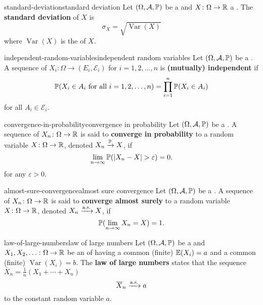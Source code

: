 \begin{topic}{standard-deviation}{standard deviation}
    Let $(\Omega, \mathcal{A}, \mathbb{P})$ be a  and $X \colon \Omega \to \mathbb{R}$ a . The \textbf{standard deviation} of $X$ is
    \[ \sigma_X = \sqrt{\operatorname{Var}(X)} \]
    where $\operatorname{Var}(X)$ is the  of $X$.
\end{topic}

\begin{topic}{independent-random-variables}{independent random variables}
    Let $(\Omega, \mathcal{A}, \mathbb{P})$ be a . A sequence of  $X_i \colon \Omega \to (E_i, \mathcal{E}_i)$ for $i = 1, 2, \ldots, n$ is \textbf{(mutually) independent} if
    \[ \mathbb{P}(X_i \in A_i \textup{ for all } i = 1, 2, \ldots, n) = \prod_{i = 1}^{n} \mathbb{P}(X_i \in A_i) \]
    for all $A_i \in \mathcal{E}_i$.
\end{topic}

\begin{topic}{convergence-in-probability}{convergence in probability}
    Let $(\Omega, \mathcal{A}, \mathbb{P})$ be a . A sequence of  $X_n \colon \Omega \to \mathbb{R}$ is said to \textbf{converge in probability} to a random variable $X \colon \Omega \to \mathbb{R}$, denoted $X_n \xrightarrow{\mathbb{P}} X$, if
    \[ \lim_{n \to \infty} \mathbb{P}(|X_n - X| > \varepsilon) = 0 . \]
    for any $\varepsilon > 0$.
\end{topic}

\begin{topic}{almost-sure-convergence}{almost sure convergence}
    Let $(\Omega, \mathcal{A}, \mathbb{P})$ be a . A sequence of  $X_n \colon \Omega \to \mathbb{R}$ is said to \textbf{converge almost surely} to a random variable $X \colon \Omega \to \mathbb{R}$, denoted $X_n \xrightarrow{\textup{a.s.}} X$, if
    \[ \mathbb{P}(\lim_{n \to \infty} X_n = X) = 1 . \]
\end{topic}

\begin{topic}{law-of-large-numbers}{law of large numbers}
    Let $(\Omega, \mathcal{A}, \mathbb{P})$ be a  and $X_1, X_2, \ldots \colon \Omega \to \mathbb{R}$ be an  of  having a common (finite)  $\mathbb{E}(X_i) = a$ and a common (finite)  $\operatorname{Var}(X_i) = b$. The \textbf{law of large numbers} states that the sequence $\overline{X}_n = \frac{1}{n} (X_1 + \cdots + X_n)$ 
    \[ \overline{X}_n \xrightarrow{\textup{a.s.}} a \]
    to the constant random variable $a$.
\end{topic}

